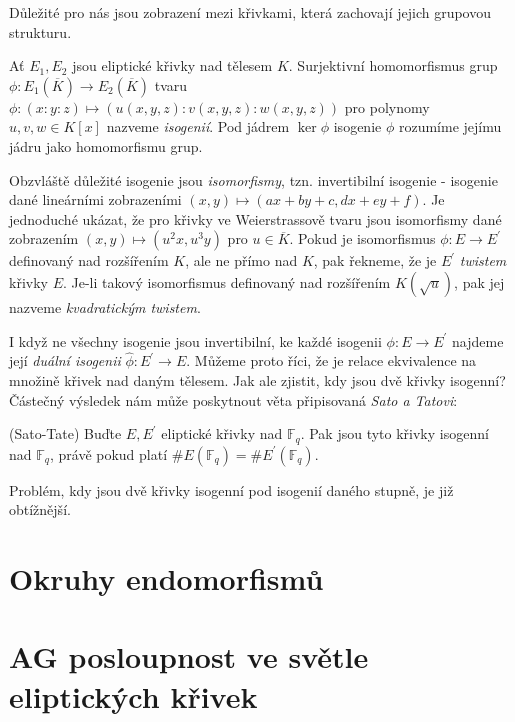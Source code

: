 \documentclass[12pt]{report}
\begin{document}
Důležité pro nás jsou zobrazení mezi křivkami, která zachovají jejich grupovou strukturu.

\begin{definice}
Ať $E_1,E_2$ jsou eliptické křivky nad tělesem $K$. Surjektivní homomorfismus grup $\phi: E_1(\overline{K}) \longrightarrow E_2(\overline{K})$ tvaru $\phi : (x:y:z) \longmapsto (u(x,y,z):v(x,y,z):w(x,y,z))$ pro polynomy $u,v,w \in K[x]$ nazveme \textit{isogenií}. Pod jádrem $\ker \phi$ isogenie $\phi$ rozumíme jejímu jádru jako homomorfismu grup. 
\end{definice}

Obzvláště důležité isogenie jsou \textit{isomorfismy}, tzn. invertibilní isogenie - isogenie dané lineárními zobrazeními $(x,y) \longmapsto (ax+by+c,dx+ey+f)$. Je jednoduché ukázat, že pro křivky ve Weierstrassově tvaru jsou isomorfismy dané zobrazením $(x,y) \longmapsto (u^2 x, u^3 y)$ pro $u \in \overline{K}$. Pokud je isomorfismus $\phi : E \longrightarrow E^{\prime}$ definovaný nad rozšířením $K$, ale ne přímo nad $K$, pak řekneme, že je $E^{\prime}$ \textit{twistem} křivky $E$. Je-li takový isomorfismus definovaný nad rozšířením $K(\sqrt{u})$, pak jej nazveme \textit{kvadratickým twistem}.

I když ne všechny isogenie jsou invertibilní, ke každé isogenii $\phi : E \longrightarrow E^{\prime}$ najdeme její \textit{duální isogenii} $\widehat{\phi} : E^{\prime} \longrightarrow E$. Můžeme proto říci, že  je relace ekvivalence na množině křivek nad daným tělesem. Jak ale zjistit, kdy jsou dvě křivky isogenní? Částečný výsledek nám může poskytnout věta připisovaná \textit{Sato a Tatovi}:
\begin{veta}\label{satotate} (Sato-Tate)
Buďte $E,E^\prime$ eliptické křivky nad $\mathbb{F}_q$. Pak jsou tyto křivky isogenní nad $\mathbb{F}_q$, právě pokud platí $\#E (\mathbb{F}_q) = \#E^\prime (\mathbb{F}_q)$.
\end{veta}

Problém, kdy jsou dvě křivky isogenní pod isogenií daného stupně, je již obtížnější.

\section{Okruhy endomorfismů}

\section{AG posloupnost ve světle eliptických křivek}
\end{document}
